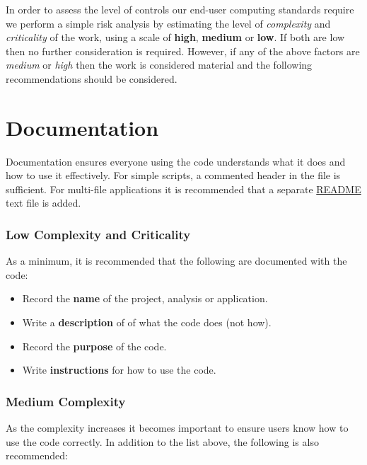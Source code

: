 \documentclass[]{book}
\providecommand{\tightlist}{%
  \setlength{\itemsep}{0pt}\setlength{\parskip}{0pt}}
\begin{document}
In order to assess the level of controls our end-user computing standards require we perform a
simple risk analysis by estimating the level of \emph{complexity} and \emph{criticality} of the work,
using a scale of \textbf{high}, \textbf{medium} or \textbf{low}. If both are low then no further consideration
is required. However, if any of the above factors are \emph{medium} or \emph{high} then the work is
considered material and the following recommendations should be considered.

\hypertarget{documentation}{%
\section{Documentation}\label{documentation}}

Documentation ensures everyone using the code understands what it does and how to use it
effectively. For simple scripts, a commented header in the file is sufficient. For multi-file
applications it is recommended that a separate
\href{http://r-pkgs.had.co.nz/release.html\#readme}{README} text file is added.

\hypertarget{low-complexity-and-criticality}{%
\subsubsection{Low Complexity and Criticality}\label{low-complexity-and-criticality}}

As a minimum, it is recommended that the following are documented with the code:

\begin{itemize}
\tightlist
\item
  Record the \textbf{name} of the project, analysis or application.
\item
  Write a \textbf{description} of of what the code does (not how).
\item
  Record the \textbf{purpose} of the code.
\item
  Write \textbf{instructions} for how to use the code.
\end{itemize}

\hypertarget{medium-complexity}{%
\subsubsection{Medium Complexity}\label{medium-complexity}}

As the complexity increases it becomes important to ensure users know how to use the code
correctly. In addition to the list above, the following is also recommended:
\end{document}
